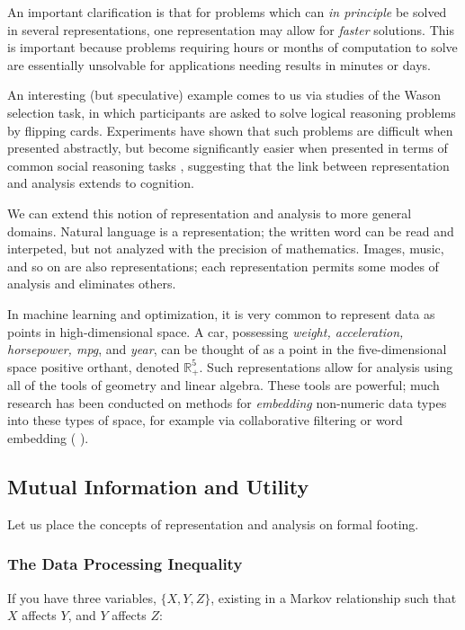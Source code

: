 An important clarification is that for problems which can \textit{in principle} be solved in several representations, one representation may allow for \textit{faster} solutions.
This is important because problems requiring hours or months of computation to solve are essentially unsolvable for applications needing results in minutes or days.

An interesting (but speculative) example comes to us via studies of the Wason selection task, in which participants are asked to solve logical reasoning problems by flipping cards.
Experiments have shown that such problems are difficult when presented abstractly, but become significantly easier when presented in terms of common social reasoning tasks \citep{cosmides}, suggesting that the link between representation and analysis extends to cognition.

\bigskip

We can extend this notion of representation and analysis to more general domains.
Natural language is a representation; the written word can be read and interpeted, but not analyzed with the precision of mathematics.
Images, music, and so on are also representations; each representation permits some modes of analysis and eliminates others.

In machine learning and optimization, it is very common to represent data as points in high-dimensional space.
A car, possessing \textit{weight, acceleration, horsepower, mpg}, and \textit{year}, can be thought of as a point in the five-dimensional space positive orthant, denoted $\mathbb{R}^5_+$.
Such representations allow for analysis using all of the tools of geometry and linear algebra.
These tools are powerful; much research has been conducted on methods for \textit{embedding} non-numeric data types into these types of space, for example via collaborative filtering or word embedding (\cite{mikolov} \cite{koren}).

\subsection{Mutual Information and Utility}

Let us place the concepts of representation and analysis on formal footing.

\subsubsection{The Data Processing Inequality}

If you have three variables, $\{X, Y, Z\}$, existing in a Markov relationship such that $X$ affects $Y$, and $Y$ affects $Z$:

